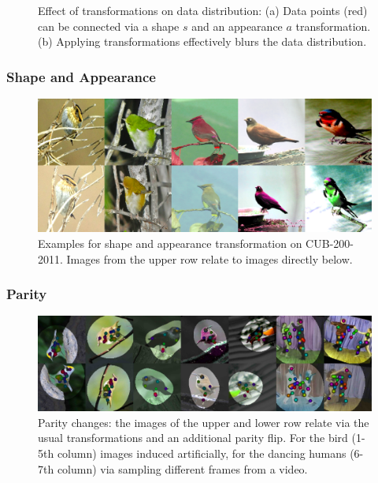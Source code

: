 \begin{frame}[t]
\begin{figure}[htp]
\begin{subfigure}{0.40\linewidth}
					\caption{}
				\end{subfigure}
				\caption{Effect of transformations on data distribution: (a) Data points (red) can be connected via a shape $s$ and an appearance $a$ transformation. (b) Applying transformations effectively blurs the data distribution.}
				\label{fig:trans}
			\end{figure}
		\end{frame}

		\begin{frame}[t]
		\frametitle{Shape and Appearance}
			\begin{figure}[htp]
				\centering
				\includegraphics[trim={0cm 0cm 0cm 0cm},clip, width=.8\linewidth]{fig/shape/coloraugm}
				\caption{Examples for shape and appearance transformation on CUB-200-2011. Images from the upper row relate to images directly below.}
				\label{fig:coloraugm}
			\end{figure}
		\end{frame}

		\begin{frame}[t]
		\frametitle{Parity}
			\begin{figure}[htp]
				\centering
				\includegraphics[trim={0cm 0cm 0cm 0cm},clip, width=1.\linewidth]{fig/shape/parity}
				\caption{Parity changes: the images of the upper and lower row relate via the usual transformations and an additional parity flip. For the bird (1-5th column) images induced artificially, for the dancing humans (6-7th column) via sampling different frames from a video.}
				\label{fig:parity}
			\end{figure}
		\end{frame}

